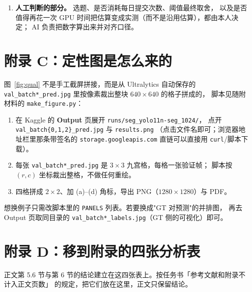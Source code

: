 \documentclass{article}
\begin{document}
\begin{enumerate}
        标注会使 PQ 被低估，并按去重后的实例数估算修正值约 0.37。随后 AI 写了四种 GT
        口径的实测评测并驱动全流程跑通，实测结果与推断\textbf{相反}：去重后 PQ 反而下降
        0.015--0.019，因为不同标注者标的是\textbf{互补子集}而非重复，并集才是最完整的 GT。
        第 \ref{sec:discussion} 节据此改写。这条记录的价值不在于 AI 算错了，而在于它
        给出了一个\textbf{可证伪的预测}，并用一次 GPU 运行把它否掉，而不是把估算写进结论。
  \item \textbf{人工判断的部分。} 选题、是否消耗每日提交次数、阈值最终取舍，
        以及是否值得再花一次 GPU 时间把估算变成实测（而不是沿用估算），都由本人决定；
        AI 负责把数字算出来并对齐口径。
\end{enumerate}

\section{附录 C：定性图是怎么来的}
图~\ref{fig:qual} 不是手工截屏拼接，而是从 Ultralytics 自动保存的
\texttt{val\_batch*\_pred.jpg} 里按像素裁出整块 $640\times640$ 的格子拼成的，
脚本见随附材料的 \texttt{make\_figure.py}：
\begin{enumerate}
  \item 在 Kaggle 的 \textbf{Output} 页展开 \texttt{runs/seg\_yolo11n-seg\_1024/}，
        点开 \texttt{val\_batch\{0,1,2\}\_pred.jpg} 与 \texttt{results.png}
        （点击文件名即可；浏览器地址栏里那条带签名的 \texttt{storage.googleapis.com}
        直链可以直接用 \texttt{curl}/脚本下载）。
  \item 每张 \texttt{val\_batch*\_pred.jpg} 是 $3\times3$ 九宫格，每格一张验证帧；
        脚本按 $(r,c)$ 坐标裁出整格，不做任何重绘。
  \item 四格拼成 $2\times2$、加 (a)--(d) 角标，导出 PNG（$1280\times1280$）与 PDF。
\end{enumerate}
想换例子只需改脚本里的 \texttt{PANELS} 列表。若要换成"GT 对预测"的并排图，
再去 Output 页取同目录的 \texttt{val\_batch*\_labels.jpg}（GT 侧的可视化）即可。


\section{附录 D：移到附录的四张分析表}
正文第 5.6 节与第 6 节的结论建立在这四张表上。按任务书「参考文献和附录不计入正文页数」
的规定，把它们放在这里，正文只保留结论。
\end{document}
